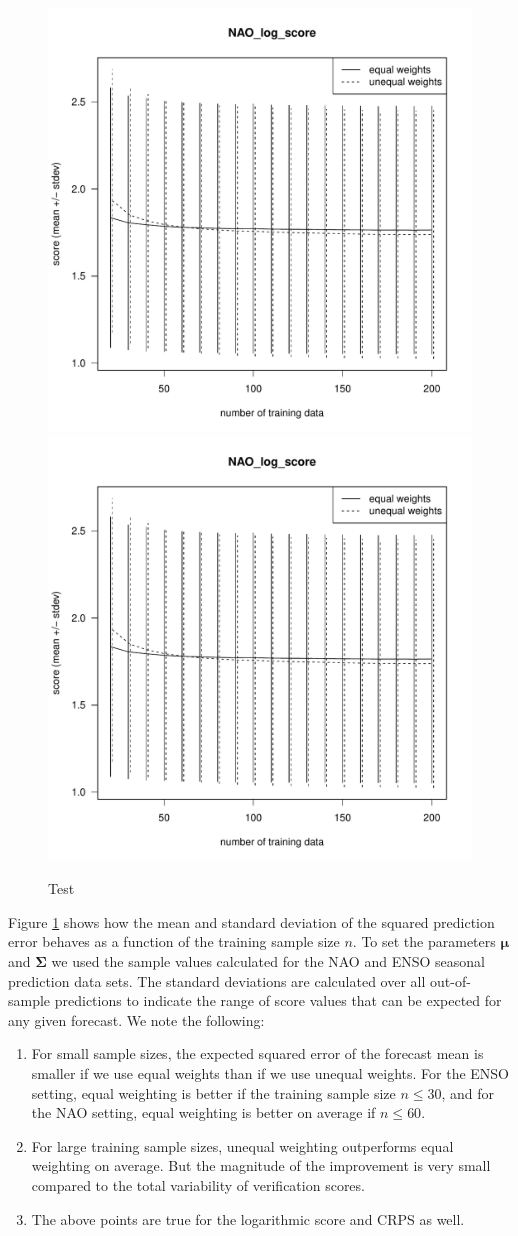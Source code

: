 \documentclass[12pt]{article}
\renewcommand{\vec}[1]{\bm{#1}}
\newcommand{\mat}[1]{\bm{#1}}
\begin{document}
\begin{figure}
\begin{center}
\includegraphics[width=.6\textwidth, page=3]{../R/n-dependence.pdf}\\
\includegraphics[width=.6\textwidth, page=6]{../R/n-dependence.pdf}
\end{center}
\caption{Test}
\label{fig:se_vs_n}
\end{figure}

Figure \ref{fig:se_vs_n} shows how the mean and standard deviation of the squared prediction error behaves as a function of the training sample size $n$.
To set the parameters $\vec{\mu}$ and $\mat{\Sigma}$ we used the sample values calculated for the NAO and ENSO seasonal prediction data sets.
The standard deviations are calculated over all out-of-sample predictions to indicate the range of score values that can be expected for any given forecast.
We note the following:
%
\begin{enumerate}
\item For small sample sizes, the expected squared error of the forecast mean is smaller if we use equal weights than if we use unequal weights.
For the ENSO setting, equal weighting is better if the training sample size $n\le30$, and for the NAO setting, equal weighting is better on average if $n\le 60$.
\item For large training sample sizes, unequal weighting outperforms equal weighting on average. But the magnitude of the improvement is very small compared to the total variability of verification scores.
\item The above points are true for the logarithmic score and CRPS as well.
\end{enumerate}
\end{document}
